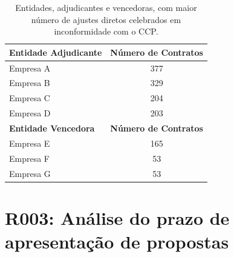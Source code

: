 \begin{table}[H]
	\centering
	\renewcommand{\arraystretch}{1.1}
	\setlength{\tabcolsep}{35pt}
		\begin{tabular}{lc}
			\hline
			\textbf{Entidade Adjudicante} & \multicolumn{1}{r}{\textbf{Número de Contratos}} \\ \hline
			Empresa A                     & 377                                              \\
			Empresa B                     & 329                                              \\
			Empresa C                     & 204                                              \\
			Empresa D                     & 203                                              \\ \hline
			\textbf{Entidade Vencedora}   & \textbf{Número de Contratos}                     \\ \hline
			Empresa E                     & 165                                              \\
			Empresa F                     & 53                                               \\
			Empresa G                     & 53                                              
		\end{tabular}%
	\caption{Entidades, adjudicantes e vencedoras, com maior número de ajustes diretos celebrados em inconformidade com o CCP.}
	\label{tab:rf1}
\end{table}


%
%
%



\section{R003: Análise do prazo de apresentação de propostas}

